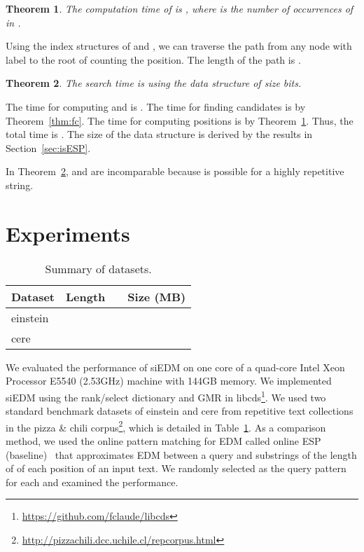 \documentclass[12pt,a4paper]{scrartcl}
\newtheorem{Theorem}{Theorem}
\newenvironment{Proof}{\trivlist \item[\hskip \labelsep{\bf proof.\/}]}{\hspace{\fill}\endtrivlist }
\begin{document}
\begin{Theorem}\label{thm:pc}
  The computation time of  is , where
   is the number of occurrences of  in .
\end{Theorem}
\begin{Proof}
Using the index structures of  and ,
we can traverse the path from any node with label  to the root of  counting the position.
The length of the path is .
\end{Proof}


\begin{Theorem}\label{thm:total}
The search time is  
using the data structure of size  bits.
\end{Theorem}
\begin{Proof}
The time for computing  and  is . 
The time for finding candidates is  by Theorem~\ref{thm:fc}. 
The time for computing positions is  by Theorem~\ref{thm:pc}.
Thus, the total time is .
The size of the data structure is derived by the results in Section~\ref{sec:isESP}. 
\end{Proof}

In Theorem~\ref{thm:total},
 and  are incomparable because 
 is possible for a highly repetitive string.

\section{Experiments}

\begin{table}
\begin{center}
  \caption{Summary of datasets.}
  \begin{tabular}{|l|c|c|c|}
    \hline
     Dataset        & Length &  & Size (MB) \\ 
\hline
     einstein &  &  &  \\
     cere     &  &    &  \\
\hline
  \end{tabular}
\label{tab:dataset}
\end{center}
\end{table}

We evaluated the performance of siEDM on one core of a quad-core Intel
Xeon Processor E5540 (2.53GHz) machine with 144GB memory.  We
implemented siEDM using the rank/select dictionary and GMR in
libcds\footnote{\url{https://github.com/fclaude/libcds}}.  We used two
standard benchmark datasets of einstein and cere from repetitive text
collections in the pizza \& chili
corpus\footnote{\url{http://pizzachili.dcc.uchile.cl/repcorpus.html}},
which is detailed in Table~\ref{tab:dataset}.  As a comparison method,
we used the online pattern matching for EDM called online ESP
(baseline)~\cite{Takabatake14-2} that approximates EDM between a query
 and substrings of the length of  of each position of an input
text.  We randomly selected  as the query pattern  for each
 and examined the performance.
\end{document}
